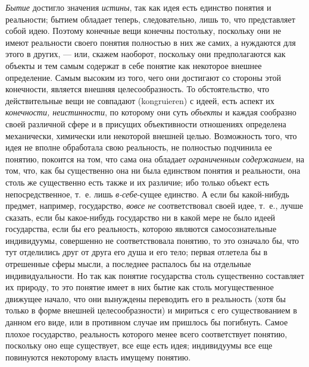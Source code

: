 \documentclass[twoside]{article}
\begin{document}
{{{{\em Бытие} достигло
значения {\em истины},
так как идея есть единство понятия и реальности; бытием
обладает теперь, следовательно, лишь то, что представляет собой идею.
Поэтому конечные вещи конечны постольку, поскольку они не имеют реальности
своего понятия полностью в них же самих, а нуждаются для этого в других, —
или, скажем наоборот, поскольку они предполагаются как
объекты и тем самым содержат в себе понятие как некоторое внешнее
определение. Самым высоким из того, чего они достигают со стороны этой
конечности, является внешняя целесообразность. То обстоятельство, что
действительные вещи не совпадают (kongruieren) с идеей, есть
аспект их {\em конечности,
неистинности}, по которому они суть
{\em объекты} и каждая
сообразно своей различной сфере и в присущих объективности отношениях
определена механически, химически или некоторой внешней целью. Возможность
того, что идея не вполне обработала свою реальность, не полностью подчинила
ее понятию, покоится на том, что сама она обладает
{\em ограниченным содержанием},
на том, что, как бы существенно она ни была единством понятия
и реальности, она столь же существенно есть также и их различие; ибо
только объект есть непосредственное, т.~е. лишь
{\em в-себе}{}-сущее
единство. А если бы какой-нибудь предмет, например, государство,
{\em вовсе не}
соответствовал своей идее, т.~е., лучше сказать, если бы
какое-нибудь государство ни в какой мере не было идеей государства, если бы
его реальность, которою являются самосознательные индивидуумы, совершенно
не соответствовала понятию, то это означало бы, что тут отделились друг от
друга его душа и его тело; первая отлетела бы в отрешенные сферы мысли, а
последнее распалось бы на отдельные индивидуальности. Но так как понятие
государства столь существенно составляет их природу, то это понятие имеет в
них бытие как столь могущественное движущее начало, что они вынуждены
переводить его в реальность (хотя бы только в форме внешней
целесообразности) и мириться с его существованием в данном его виде, или в
противном случае им пришлось бы погибнуть. Самое плохое государство,
реальность которого менее всего соответствует понятию, поскольку оно еще
существует, все еще есть идея; индивидуумы все еще повинуются некоторому
власть имущему понятию.

}}}
\end{document}
